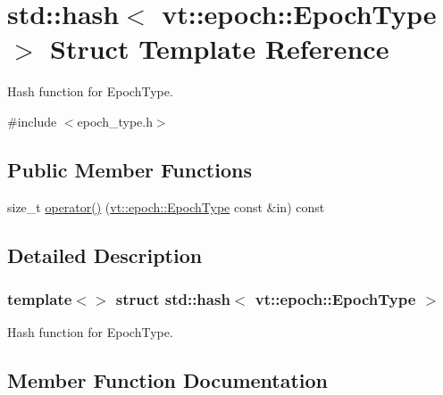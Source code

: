 \hypertarget{structstd_1_1hash_3_01vt_1_1epoch_1_1_epoch_type_01_4}{}\section{std\+:\+:hash$<$ vt\+:\+:epoch\+:\+:Epoch\+Type $>$ Struct Template Reference}
\label{structstd_1_1hash_3_01vt_1_1epoch_1_1_epoch_type_01_4}


Hash function for {\ttfamily Epoch\+Type}.  




{\ttfamily \#include $<$epoch\+\_\+type.\+h$>$}

\subsection*{Public Member Functions}
\begin{DoxyCompactItemize}
\item 
size\+\_\+t \hyperlink{structstd_1_1hash_3_01vt_1_1epoch_1_1_epoch_type_01_4_ad1bbc04136747dfd259a5f5d6cb77f66}{operator()} (\hyperlink{structvt_1_1epoch_1_1_epoch_type}{vt\+::epoch\+::\+Epoch\+Type} const \&in) const
\end{DoxyCompactItemize}


\subsection{Detailed Description}
\subsubsection*{template$<$$>$\newline
struct std\+::hash$<$ vt\+::epoch\+::\+Epoch\+Type $>$}

Hash function for {\ttfamily Epoch\+Type}. 

\subsection{Member Function Documentation}
\mbox{\label{structstd_1_1hash_3_01vt_1_1epoch_1_1_epoch_type_01_4_ad1bbc04136747dfd259a5f5d6cb77f66}} 
